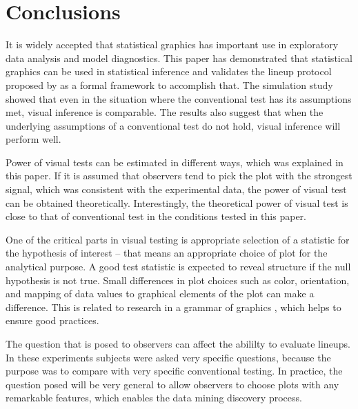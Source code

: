 \documentclass[12pt]{article}
\begin{document}
\section{Conclusions}



It is widely accepted that statistical graphics has important use in exploratory data analysis and model diagnostics. This paper has demonstrated that statistical graphics can be used in statistical inference and validates the lineup protocol proposed by \citet{buja:2009} as a formal framework to accomplish that. The simulation study showed that even in the situation where the conventional test has its assumptions met, visual inference is comparable. The results also suggest that when the underlying assumptions of a conventional test do not hold, visual inference will perform well. 

Power of visual tests can be estimated in different ways, which was explained in this paper. If it is assumed that observers tend to pick the plot with the strongest signal, which was consistent with the experimental data, the power of visual test can be obtained theoretically.  Interestingly, the theoretical power of visual test is close to that of conventional test in the conditions tested in this paper.


One of the critical parts in visual testing is appropriate selection of a statistic for the hypothesis of interest -- that means an appropriate choice of plot for the analytical purpose.  A good test statistic is expected to reveal structure if the null hypothesis is not true. Small differences in plot choices such as color, orientation, and mapping of data values to graphical elements of the plot can make a difference. This is related to research in a grammar of graphics \citep{wilkinson:1999,hadley:2009}, which helps to ensure good practices. %

The question that is posed to observers can affect the abililty to evaluate lineups. In these experiments subjects were asked very specific questions, because the purpose was to compare with very specific conventional testing. In practice, the question posed will be very general to allow observers to choose plots with any remarkable features, which enables the data mining discovery process.
\end{document}
